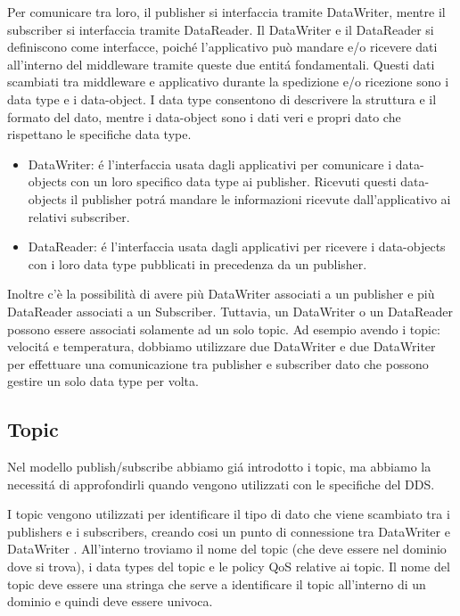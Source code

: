 Per comunicare tra loro, il publisher si interfaccia tramite
DataWriter, 
mentre il subscriber si interfaccia tramite DataReader.
Il DataWriter e il DataReader si definiscono come interfacce, 
poiché l'applicativo
può mandare e/o ricevere dati all'interno del middleware
tramite queste due entitá fondamentali. 
Questi dati scambiati tra middleware e applicativo durante la spedizione e/o 
ricezione sono i data type e i data-object. I data type consentono di 
descrivere la struttura e il formato del dato, mentre i data-object
sono i dati veri e propri dato che rispettano le specifiche data type.
\begin{itemize}
    \item DataWriter: é l'interfaccia usata dagli applicativi 
    per comunicare i
    data-objects con un loro specifico data type ai publisher.
    Ricevuti questi data-objects il publisher potrá mandare le
    informazioni ricevute dall'applicativo ai relativi subscriber.
    \item DataReader: é l'interfaccia usata dagli applicativi per
    ricevere i data-objects con i loro data type pubblicati in
    precedenza da un publisher.
\end{itemize}\cite{dds1.4}
Inoltre c'è la possibilità di avere 
più DataWriter associati a un publisher e più DataReader associati a 
un Subscriber. Tuttavia, un DataWriter o un DataReader possono essere 
associati solamente ad un solo topic.
Ad esempio avendo i topic: velocitá e temperatura, dobbiamo utilizzare
due DataWriter e due DataWriter per effettuare una comunicazione tra
publisher e subscriber dato che possono gestire un solo data type per volta.


\subsection{Topic}
Nel modello publish/subscribe abbiamo giá introdotto i topic, ma 
abbiamo la necessitá di approfondirli quando vengono utilizzati
con le specifiche del DDS.

I topic vengono utilizzati per identificare il tipo di dato che viene
scambiato tra i publishers e i subscribers, creando cosi un punto
di connessione 
tra DataWriter e DataWriter\cite{topicomg} .
All'interno troviamo il nome del topic
(che deve essere nel dominio dove si trova),
i data types del topic e le policy QoS relative ai topic.
Il nome del topic deve essere una stringa che serve 
a identificare il topic all'interno di un dominio e quindi deve essere
univoca.




